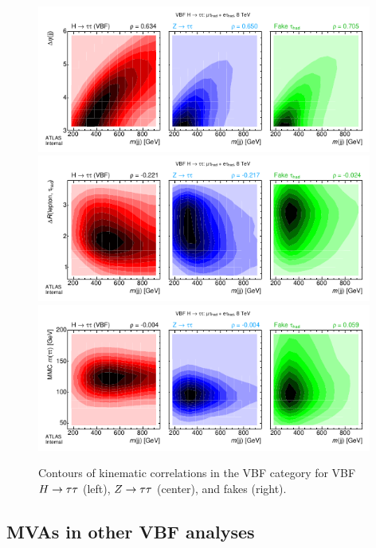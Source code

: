 \begin{figure}[tp]
  \centering
  \includegraphics[width=0.98\textwidth]{figures/kinematiccorrelations/jj_mass-vs-jj_deta} \\
  \includegraphics[width=0.98\textwidth]{figures/kinematiccorrelations/jj_mass-vs-taulep_dR} \\
  \includegraphics[width=0.98\textwidth]{figures/kinematiccorrelations/jj_mass-vs-mMMC} \\
  \caption{Contours of kinematic correlations in the VBF category for VBF $H\rightarrow\tau\tau$ (left), $Z\rightarrow\tau\tau$ (center), and fakes (right).}
  \label{fig:strategy-kinematic-correlations-2}
\end{figure}
\clearpage

\subsection{MVAs in other VBF analyses}
\label{sec:strategy-mva-elsewhere}

